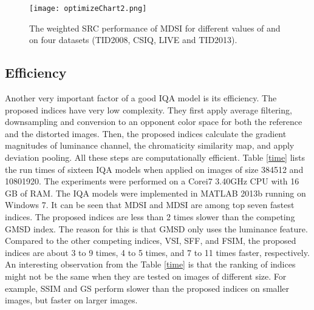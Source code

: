 

\begin{figure}[htb]
\scriptsize
\begin{minipage}[b]{0.99\linewidth}
  \centering
  \centerline{\texttt{[image: optimizeChart2.png]}} 
\end{minipage}
\caption{The weighted SRC performance of MDSI for different values of  and  on four datasets (TID2008, CSIQ, LIVE and TID2013).}
\label{fig:parameters2}
\end{figure}




          




      


\subsection{Efficiency}
\label{efficiency}


Another very important factor of a good IQA model is its efficiency. The proposed indices have very low complexity. They first apply average filtering, downsampling and conversion to an opponent color space for both the reference and the distorted images. Then, the proposed indices calculate the gradient magnitudes of luminance channel, the chromaticity similarity map, and apply deviation pooling. All these steps are computationally efficient. Table \ref{time} lists the run times of sixteen IQA models when applied on images of size 384512 and 10801920. The experiments were performed on a Corei7 3.40GHz CPU with 16 GB of RAM. The IQA models were implemented in MATLAB 2013b running on Windows 7. It can be seen that MDSI and MDSI are among top seven fastest indices. The proposed indices are less than 2 times slower than the competing GMSD index. The reason for this is that GMSD only uses the luminance feature. Compared to the other competing indices, VSI, SFF, and FSIM, the proposed indices are about 3 to 9 times, 4 to 5 times, and 7 to 11 times faster, respectively. An interesting observation from the Table \ref{time} is that the ranking of indices might not be the same when they are tested on images of different size. For example, SSIM and GS perform slower than the proposed indices on smaller images, but faster on larger images. 


